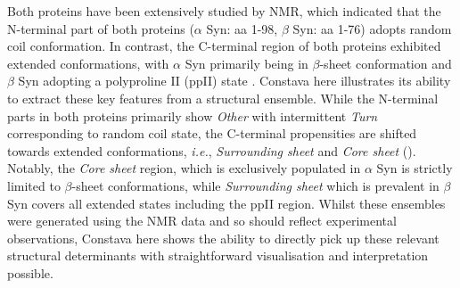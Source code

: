 Both proteins have been extensively studied by NMR, which indicated that the N-terminal part of both proteins ($\alpha$ Syn: aa 1-98, $\beta$ Syn: aa 1-76) adopts random coil conformation. In contrast, the C-terminal region of both proteins exhibited extended conformations, with $\alpha$ Syn primarily being in $\beta$-sheet conformation \cite{allison_relationship_2014} and $\beta$ Syn adopting a polyproline II (ppII) state \cite{bertoncini_structural_2007}. Constava here illustrates its ability to extract these key features from a structural ensemble. While the N-terminal parts in both proteins primarily show \textit{Other} with intermittent \textit{Turn} corresponding to random coil state, the C-terminal propensities are shifted towards extended conformations, \textit{i.e.}, \textit{Surrounding sheet} and \textit{Core sheet} (). Notably, the \textit{Core sheet} region, which is exclusively populated in $\alpha$ Syn is  strictly limited to $\beta$-sheet conformations, while \textit{Surrounding sheet} which is prevalent in $\beta$ Syn covers all extended states including the ppII region. Whilst these ensembles were generated using the NMR data and so should reflect experimental observations, Constava here shows the ability to directly pick up these relevant structural determinants with straightforward visualisation and interpretation possible.

